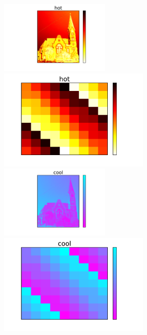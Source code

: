 \documentclass{beamer}
\begin{document}
\begin{frame}
\begin{columns}
\begin{column}{0.5\textwidth}
\end{column}
\begin{column}{0.5\textwidth}
\begin{center}
\vfill
\includegraphics[width=0.42\textwidth]{church_hot.pdf}
\includegraphics[width=0.58\textwidth]{magicsquare_hot.pdf}\newline\newline
\vfill
\includegraphics[width=0.42\textwidth]{church_cool.pdf}
\includegraphics[width=0.58\textwidth]{magicsquare_cool.pdf}
\vfill
\end{center}
\end{column}
\end{columns}
\end{frame}
\end{document}
